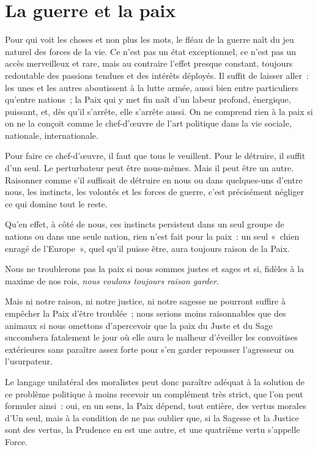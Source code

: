 \documentclass[french,twoside]{book} %
\begin{document}
\section[La guerre et la paix]{La guerre et la paix}
\noindent Pour qui voit les choses et non plus les mots, le fléau de la guerre naît du jeu naturel des forces de la vie. Ce n’est pas un état exceptionnel, ce n’est pas un accès merveilleux et rare, mais au contraire l’effet presque constant, toujours redoutable des passions tendues et des intérêts déployés. Il suffit de laisser aller : les unes et les autres aboutissent à la lutte armée, aussi bien entre particuliers qu’entre nations ; la Paix qui y met fin naît d’un labeur profond, énergique, puissant, et, dès qu’il s’arrête, elle s’arrête aussi. On ne comprend rien à la paix si on ne la conçoit comme le chef-d’œuvre de l’art politique dans la vie sociale, nationale, internationale.\par
Pour faire ce chef-d’œuvre, il faut que tous le veuillent. Pour le détruire, il suffit d’un seul. Le perturbateur peut être nous-mêmes. Mais il peut être un autre. Raisonner comme s’il suffisait de détruire en nous ou dans quelques-uns d’entre nous, les instincts, les volontés et les forces de guerre, c’est précisément négliger ce qui domine tout le reste.\par
Qu’en effet, à côté de nous, ces instincts persistent dans un seul groupe de nations ou dans une seule nation, rien n’est fait pour la paix : un seul « chien enragé de l’Europe », quel qu’il puisse être, aura toujours raison de la Paix.\par
Nous ne troublerons pas la paix si nous sommes justes et sages et si, fidèles à la maxime de nos rois, \emph{nous voulons toujours raison garder}.\par
Mais ni notre raison, ni notre justice, ni notre sagesse ne pourront suffire à empêcher la Paix d’être troublée ; nous serions moins raisonnables que des animaux si nous omettons d’apercevoir que la paix du Juste et du Sage succombera fatalement le jour où elle aura le malheur d’éveiller les convoitises extérieures sans paraître assez forte pour s’en garder repousser l’agresseur ou l’usurpateur.\par
Le langage unilatéral des moralistes peut donc paraître adéquat à la solution de ce problème politique à moins recevoir un complément très strict, que l’on peut formuler ainsi : oui, en un sens, la Paix dépend, tout entière, des vertus morales d’Un seul, mais à la condition de ne pas oublier que, si la Sagesse et la Justice sont des vertus, la Prudence en est une autre, et une quatrième vertu s’appelle Force.\par
\end{document}
